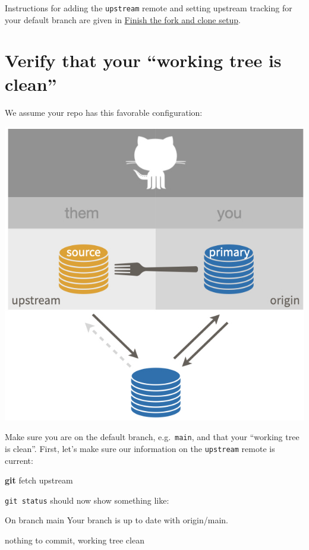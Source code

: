 \documentclass[
]{book}
\newenvironment{Shaded}{\begin{snugshade}}{\end{snugshade}}
\newcommand{\ExtensionTok}[1]{#1}
\newcommand{\FunctionTok}[1]{\textcolor[rgb]{0.13,0.29,0.53}{\textbf{#1}}}
\newcommand{\NormalTok}[1]{#1}
\newcommand{\StringTok}[1]{\textcolor[rgb]{0.31,0.60,0.02}{#1}}
\begin{document}
Instructions for adding the \texttt{upstream} remote and setting upstream tracking for your default branch are given in \hyperref[fork-and-clone-finish]{Finish the fork and clone setup}.

\section{Verify that your ``working tree is clean''}\label{verify-that-your-working-tree-is-clean}

We assume your repo has this favorable configuration:

\begin{center}\includegraphics[width=0.6\linewidth]{img/fork-them} \end{center}

Make sure you are on the default branch, e.g.~\texttt{main}, and that your ``working tree is clean''.
First, let's make sure our information on the \texttt{upstream} remote is current:

\begin{Shaded}
\begin{Highlighting}[]
\FunctionTok{git}\NormalTok{ fetch upstream}
\end{Highlighting}
\end{Shaded}

\texttt{git\ status} should now show something like:

\begin{Shaded}
\begin{Highlighting}[]
\ExtensionTok{On}\NormalTok{ branch main}
\ExtensionTok{Your}\NormalTok{ branch is up to date with }\StringTok{\textquotesingle{}origin/main\textquotesingle{}}\NormalTok{.}

\ExtensionTok{nothing}\NormalTok{ to commit, working tree clean}
\end{Highlighting}
\end{Shaded}
\end{document}

